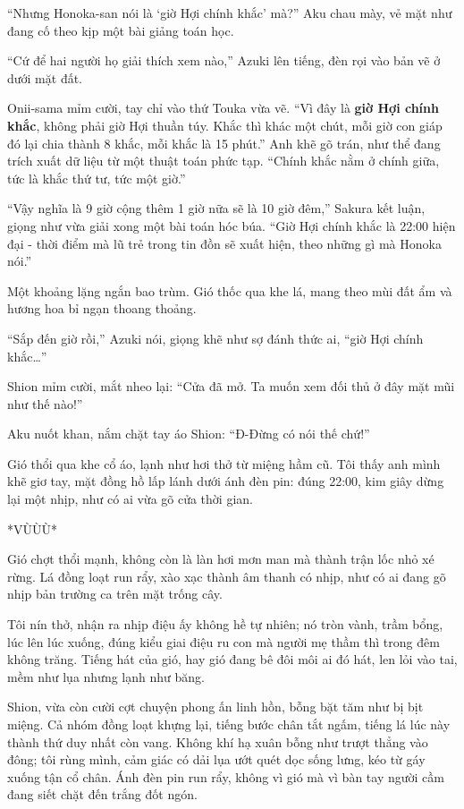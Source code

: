 \documentclass[../main.tex]{subfiles}
\begin{document}
``Nhưng Honoka-san nói là `giờ Hợi chính khắc' mà?'' Aku chau mày, vẻ mặt như đang cố theo kịp một bài giảng toán học.

``Cứ để hai người họ giải thích xem nào,'' Azuki lên tiếng, đèn rọi vào bản vẽ ở dưới mặt đất.

Onii-sama mỉm cười, tay chỉ vào thứ Touka vừa vẽ. ``Vì đây là \textbf{giờ Hợi chính khắc}, không phải giờ Hợi thuần túy. Khắc thì khác một chút, mỗi giờ con giáp đó lại chia thành 8 khắc, mỗi khắc là 15 phút.'' Anh khẽ gõ trán, như thể đang trích xuất dữ liệu từ một thuật toán phức tạp. ``Chính khắc nằm ở chính giữa, tức là khắc thứ tư, tức một giờ.''

``Vậy nghĩa là 9 giờ cộng thêm 1 giờ nữa sẽ là 10 giờ đêm,'' Sakura kết luận, giọng như vừa giải xong một bài toán hóc búa. ``Giờ Hợi chính khắc là 22:00 hiện đại - thời điểm mà lũ trẻ trong tin đồn sẽ xuất hiện, theo những gì mà Honoka nói.''

Một khoảng lặng ngắn bao trùm. Gió thốc qua khe lá, mang theo mùi đất ẩm và hương hoa bỉ ngạn thoang thoảng.

``Sắp đến giờ rồi,'' Azuki nói, giọng khẽ như sợ đánh thức ai, ``giờ Hợi chính khắc\dots''

Shion mỉm cười, mắt nheo lại: ``Cửa đã mở. Ta muốn xem đối thủ ở đây mặt mũi như thế nào!''

Aku nuốt khan, nắm chặt tay áo Shion: ``Đ-Đừng có nói thế chứ!''

Gió thổi qua khe cổ áo, lạnh như hơi thở từ miệng hầm cũ. Tôi thấy anh mình khẽ giơ tay, mặt đồng hồ lấp lánh dưới ánh đèn pin: đúng 22:00, kim giây dừng lại một nhịp, như có ai vừa gõ cửa thời gian.

*VÙÙÙ*

Gió chợt thổi mạnh, không còn là làn hơi mơn man mà thành trận lốc nhỏ xé rừng. Lá đồng loạt run rẩy, xào xạc thành âm thanh có nhịp, như có ai đang gõ nhịp bản trường ca trên mặt trống cây.

Tôi nín thở, nhận ra nhịp điệu ấy không hề tự nhiên; nó tròn vành, trầm bổng, lúc lên lúc xuống, đúng kiểu giai điệu ru con mà người mẹ thầm thì trong đêm không trăng. Tiếng hát của gió, hay gió đang bê đôi môi ai đó hát, len lỏi vào tai, mềm như lụa nhưng lạnh như băng.

Shion, vừa còn cười cợt chuyện phong ấn linh hồn, bỗng bặt tăm như bị bịt miệng. Cả nhóm đồng loạt khựng lại, tiếng bước chân tắt ngấm, tiếng lá lúc này thành thứ duy nhất còn vang. Không khí hạ xuân bỗng như trượt thẳng vào đông; tôi rùng mình, cảm giác có dải lụa ướt quét dọc sống lưng, kéo từ gáy xuống tận cổ chân. Ánh đèn pin run rẩy, không vì gió mà vì bàn tay người cầm đang siết chặt đến trắng đốt ngón.
\end{document}
